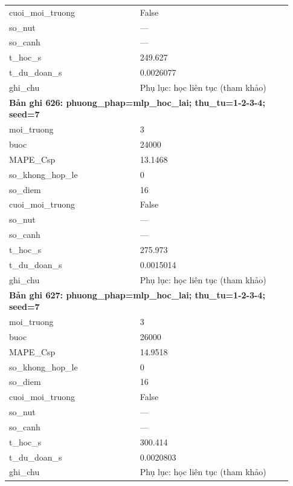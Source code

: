 \begin{longtable}{p{0.43\linewidth}p{0.50\linewidth}}
cuoi\_\allowbreak moi\_\allowbreak truong & False \\
so\_\allowbreak nut & — \\
so\_\allowbreak canh & — \\
t\_\allowbreak hoc\_\allowbreak s & 249.627 \\
t\_\allowbreak du\_\allowbreak doan\_\allowbreak s & 0.0026077 \\
ghi\_\allowbreak chu & Phụ lục: học liên tục (tham khảo) \\
\midrule
\multicolumn{2}{p{0.95\linewidth}}{\textbf{Bản ghi 626: phuong\_phap=mlp\_hoc\_lai; thu\_tu=1-2-3-4; seed=7}} \\
moi\_\allowbreak truong & 3 \\
buoc & 24000 \\
MAPE\_\allowbreak Csp & 13.1468 \\
so\_\allowbreak khong\_\allowbreak hop\_\allowbreak le & 0 \\
so\_\allowbreak diem & 16 \\
cuoi\_\allowbreak moi\_\allowbreak truong & False \\
so\_\allowbreak nut & — \\
so\_\allowbreak canh & — \\
t\_\allowbreak hoc\_\allowbreak s & 275.973 \\
t\_\allowbreak du\_\allowbreak doan\_\allowbreak s & 0.0015014 \\
ghi\_\allowbreak chu & Phụ lục: học liên tục (tham khảo) \\
\midrule
\multicolumn{2}{p{0.95\linewidth}}{\textbf{Bản ghi 627: phuong\_phap=mlp\_hoc\_lai; thu\_tu=1-2-3-4; seed=7}} \\
moi\_\allowbreak truong & 3 \\
buoc & 26000 \\
MAPE\_\allowbreak Csp & 14.9518 \\
so\_\allowbreak khong\_\allowbreak hop\_\allowbreak le & 0 \\
so\_\allowbreak diem & 16 \\
cuoi\_\allowbreak moi\_\allowbreak truong & False \\
so\_\allowbreak nut & — \\
so\_\allowbreak canh & — \\
t\_\allowbreak hoc\_\allowbreak s & 300.414 \\
t\_\allowbreak du\_\allowbreak doan\_\allowbreak s & 0.0020803 \\
ghi\_\allowbreak chu & Phụ lục: học liên tục (tham khảo) \\

\end{longtable}

